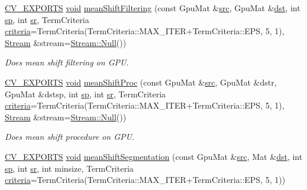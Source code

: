 \begin{DoxyCompactItemize}
\hyperlink{core_2types__c_8h_a1bf9f0e121b54272da02379cfccd0a2b}{C\-V\-\_\-\-E\-X\-P\-O\-R\-T\-S} \hyperlink{legacy_8hpp_a8bb47f092d473522721002c86c13b94e}{void} \hyperlink{namespacecv_1_1gpu_ac6fb3aff49f1873855d0c5318f0c5b43}{mean\-Shift\-Filtering} (const Gpu\-Mat \&\hyperlink{legacy_8hpp_a371cd109b74033bc4366f584edd3dacc}{src}, Gpu\-Mat \&\hyperlink{photo__c_8h_aed13e2a25279b24dc954073233fef7a5}{dst}, int \hyperlink{imgproc__c_8h_ac14bc2e984efdff6b1fa7e106f3ac14a}{sp}, int \hyperlink{imgproc__c_8h_acecaf9a0f96f944ff768b10358b45839}{sr}, Term\-Criteria \hyperlink{tracking_8hpp_ac10fcea99ab081e745366c6f5bbc8eb5}{criteria}=Term\-Criteria(Term\-Criteria\-::\-M\-A\-X\-\_\-\-I\-T\-E\-R+Term\-Criteria\-::\-E\-P\-S, 5, 1), \hyperlink{classcv_1_1gpu_1_1Stream}{Stream} \&stream=\hyperlink{classcv_1_1gpu_1_1Stream_af96c23564834f88333dcb8997df553f1}{Stream\-::\-Null}())
\begin{DoxyCompactList}\small\item\em Does mean shift filtering on G\-P\-U. \end{DoxyCompactList}\item 
\hyperlink{core_2types__c_8h_a1bf9f0e121b54272da02379cfccd0a2b}{C\-V\-\_\-\-E\-X\-P\-O\-R\-T\-S} \hyperlink{legacy_8hpp_a8bb47f092d473522721002c86c13b94e}{void} \hyperlink{namespacecv_1_1gpu_ae2c4dc45950c634896af05b9a5087b39}{mean\-Shift\-Proc} (const Gpu\-Mat \&\hyperlink{legacy_8hpp_a371cd109b74033bc4366f584edd3dacc}{src}, Gpu\-Mat \&dstr, Gpu\-Mat \&dstsp, int \hyperlink{imgproc__c_8h_ac14bc2e984efdff6b1fa7e106f3ac14a}{sp}, int \hyperlink{imgproc__c_8h_acecaf9a0f96f944ff768b10358b45839}{sr}, Term\-Criteria \hyperlink{tracking_8hpp_ac10fcea99ab081e745366c6f5bbc8eb5}{criteria}=Term\-Criteria(Term\-Criteria\-::\-M\-A\-X\-\_\-\-I\-T\-E\-R+Term\-Criteria\-::\-E\-P\-S, 5, 1), \hyperlink{classcv_1_1gpu_1_1Stream}{Stream} \&stream=\hyperlink{classcv_1_1gpu_1_1Stream_af96c23564834f88333dcb8997df553f1}{Stream\-::\-Null}())
\begin{DoxyCompactList}\small\item\em Does mean shift procedure on G\-P\-U. \end{DoxyCompactList}\item 
\hyperlink{core_2types__c_8h_a1bf9f0e121b54272da02379cfccd0a2b}{C\-V\-\_\-\-E\-X\-P\-O\-R\-T\-S} \hyperlink{legacy_8hpp_a8bb47f092d473522721002c86c13b94e}{void} \hyperlink{namespacecv_1_1gpu_a71ab42839dd13a7c9ee84abe91ddb471}{mean\-Shift\-Segmentation} (const Gpu\-Mat \&\hyperlink{legacy_8hpp_a371cd109b74033bc4366f584edd3dacc}{src}, Mat \&\hyperlink{photo__c_8h_aed13e2a25279b24dc954073233fef7a5}{dst}, int \hyperlink{imgproc__c_8h_ac14bc2e984efdff6b1fa7e106f3ac14a}{sp}, int \hyperlink{imgproc__c_8h_acecaf9a0f96f944ff768b10358b45839}{sr}, int minsize, Term\-Criteria \hyperlink{tracking_8hpp_ac10fcea99ab081e745366c6f5bbc8eb5}{criteria}=Term\-Criteria(Term\-Criteria\-::\-M\-A\-X\-\_\-\-I\-T\-E\-R+Term\-Criteria\-::\-E\-P\-S, 5, 1))

\end{DoxyCompactItemize}
